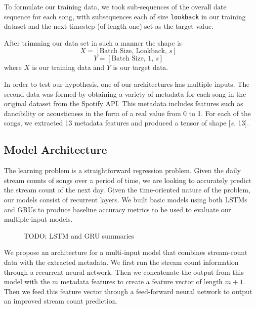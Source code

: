\documentclass[11pt]{article}
\begin{document}

To formulate our training data, we took sub-sequences of the overall date sequence for each song, with subsequences each of size \texttt{lookback} in our training dataset and the next timestep (of length one) set as the target value.

 After trimming our data set in such a manner the shape is 
\[X = [\text{Batch Size, Lookback, $s$}]\]
\[Y = [\text{Batch Size, 1, $s$}]\]
where $X$ is our training data and $Y$ is our target data.

In order to test our hypothesis, one of our architectures has multiple inputs. The second data was formed by obtaining a variety of metadata for each song in the original dataset from the Spotify API. This metadata includes features such as dancibility or acousticness in the form of a real value from 0 to 1. For each of the songs, we extracted 13 metadata features and produced a tensor of shape [$s$, 13].

\subsection{Model Architecture}

The learning problem is a straightforward regression problem. Given the daily stream counts of songs over a period of time, we are looking to accurately predict the stream count of the next day. Given the time-oriented nature of the problem, our models consist of recurrent layers. We built basic models using both LSTMs and GRUs to produce baseline accuracy metrics to be used to evaluate our multiple-input models. 

\begin{figure}
    \centering{}
    \caption{TODO: LSTM and GRU summaries}
\end{figure}

We propose an architecture for a multi-input model that combines stream-count data with the extracted metadata. We first run the stream count information through a recurrent neural network. Then we concatenate the output from this model with the $m$ metadata features to create a feature vector of length $m + 1$. Then we feed this feature vector through a feed-forward neural network to output an improved stream count prediction.
\end{document}
